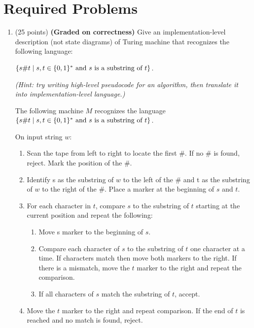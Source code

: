 \documentclass{article}
\theoremstyle{definition}
\newenvironment {solution}
{
\begin{tcolorbox}
}
{
\end{tcolorbox}
}
\begin{document}
\section{Required Problems}
\begin{enumerate}
    \item  (25 points) \textbf{(Graded on correctness)} Give an implementation-level description (not state diagrams) of Turing machine that recognizes the following language:
       
        $\{s\#t \mid s,t \in \{0,1\}^* \textnormal{ and } s \textnormal{ is a substring of } t\}$.
        
        \textit{(Hint: try writing high-level pseudocode for an algorithm, then translate it into implementation-level language.)}

        \begin{solution}
            The following machine $M$ recognizes the language $\{s\#t \mid s,t 
            \in \{0,1\}^* \textnormal{ and } s \textnormal{ is a substring of } t\}$.

            On input string $w$:
            \begin{enumerate}
                \item Scan the tape from left to right to locate the first $\#$.
                If no $\#$ is found, reject. Mark the position of the $\#$.
                \item Identify s as the substring of $w$ to the left of the $\#$
                and t as the substring of $w$ to the right of the $\#$. Place 
                a marker at the beginning of $s$ and $t$.
                \item For each character in $t$, compare $s$ to the substring of
                $t$ starting at the current position and repeat the following:
                \begin{enumerate}
                    \item Move s marker to the beginning of $s$.
                    \item Compare each character of $s$ to the substring of $t$
                    one character at a time. If characters match then move
                    both markers to the right. If there is a mismatch, move the
                    $t$ marker to the right and repeat the comparison.
                    \item If all characters of $s$ match the substring of $t$,
                    accept.
                \end{enumerate}
                \item Move the $t$ marker to the right and repeat comparison. If
                the end of $t$ is reached and no match is found, reject.
            \end{enumerate}
        \end{solution}


\end{enumerate}
\end{document}
